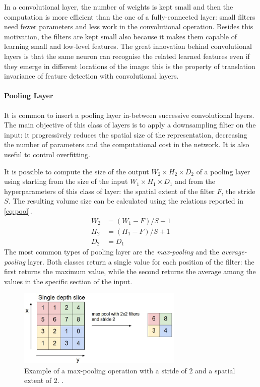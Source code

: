 In a convolutional layer, the number of weights is kept small and then the computation is more efficient than the one of a fully-connected layer: small filters need fewer parameters and less work in the convolutional operation. Besides this motivation, the filters are kept small also because it makes them capable of learning small and low-level features. The great innovation behind convolutional layers is that the same neuron can recognise the related learned features even if they emerge in different locations of the image: this is the property of translation invariance of feature detection with convolutional layers.


\paragraph{Pooling Layer}

It is common to insert a pooling layer in-between successive convolutional layers. The main objective of this class of layers is to apply a downsampling filter on the input: it progressively reduces the spatial size of the representation, decreasing the number of parameters and the computational cost in the network. It is also useful to control overfitting.

It is possible to compute the size of the output $W_2 \times H_2 \times D_2$ of a pooling layer using starting from the size of the input $W_1 \times H_1 \times D_1$ and from the hyperparameters of this class of layer: the spatial extent of the filter $F$, the stride $S$. The resulting volume size can be calculated using the relations reported in \vref{eq:pool}.
\begin{equation} \label{eq:pool}
	\begin{aligned}
		W_2 & = (W_1 - F)/S + 1  \\
		H_2 & = (H_1 - F )/S + 1 \\
		D_2 & = D_1
	\end{aligned}
\end{equation}
The most common types of pooling layer are the \textit{max-pooling} and the \textit{average-pooling} layer. Both classes return a single value for each position of the filter: the first returns the maximum value, while the second returns the average among the values in the specific section of the input.



\begin{figure}[!h]
	\centering
	\includegraphics[width=0.7\textwidth]{img/maxpool.jpeg}
	\caption{ Example of a max-pooling operation with a stride of 2 and a spatial extent of 2. \cite{stanford2019cs231n}.}
	\label{fig:avgpool}
\end{figure}

